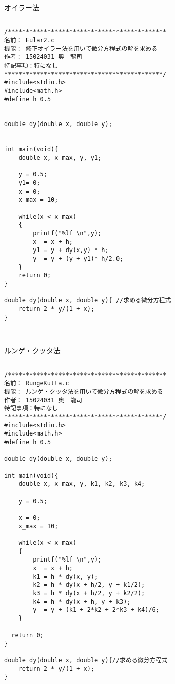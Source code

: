 \documentclass[a4j,titlepage]{jarticle}
\begin{document}
 \begin{breakitembox}[l]{オイラー法} \small
\begin{verbatim}

/********************************************
名前： Eular2.c
機能： 修正オイラー法を用いて微分方程式の解を求める
作者： 15024031 奥　龍司
特記事項：特になし
********************************************/
#include<stdio.h>
#include<math.h>
#define h 0.5


double dy(double x, double y);


int main(void){
    double x, x_max, y, y1;
    
    y = 0.5;
    y1= 0;
    x = 0;
    x_max = 10;
    
    while(x < x_max)
    {
        printf("%lf \n",y);
        x  = x + h;
        y1 = y + dy(x,y) * h;
        y  = y + (y + y1)* h/2.0;
    }
    return 0;
}

double dy(double x, double y){ //求める微分方程式
    return 2 * y/(1 + x);
}



\end{verbatim}
\end{breakitembox}

 
\begin{breakitembox}[l]{ルンゲ・クッタ法} \small
\begin{verbatim}

/********************************************
名前： RungeKutta.c
機能： ルンゲ・クッタ法を用いて微分方程式の解を求める
作者： 15024031 奥　龍司
特記事項：特になし
********************************************/
#include<stdio.h>
#include<math.h>
#define h 0.5

double dy(double x, double y);

int main(void){
    double x, x_max, y, k1, k2, k3, k4;
    
    y = 0.5;
    
    x = 0;
    x_max = 10;
    
    while(x < x_max)
    {
        printf("%lf \n",y);
        x  = x + h;
        k1 = h * dy(x, y);
        k2 = h * dy(x + h/2, y + k1/2);
        k3 = h * dy(x + h/2, y + k2/2);
        k4 = h * dy(x + h, y + k3);
        y  = y + (k1 + 2*k2 + 2*k3 + k4)/6;
    }
    
  return 0;
}

double dy(double x, double y){//求める微分方程式
    return 2 * y/(1 + x);
}

\end{verbatim}
\end{breakitembox}
\end{document}
